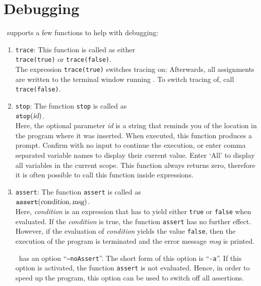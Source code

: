 \section{Debugging}
\setlx\ supports a few functions to help with debugging:
\begin{enumerate}
\item \texttt{trace}:  This function is called as either
      \\[0.2cm]
      \hspace*{1.3cm}
      \texttt{trace(true)} \quad or \quad \texttt{trace(false)}.
      \\[0.2cm]
      The expression \texttt{trace(true)} switches tracing on:  Afterwards, all
      assignments are written to the terminal window running \setlx.  To switch tracing
      of, call \texttt{trace(false)}.
\item \texttt{stop}:  The function \texttt{stop}  is called as
      \\[0.2cm]
      \hspace*{1.3cm}
      $\texttt{stop}(\textsl{id})$.
      \\[0.2cm]
      Here, the optional parameter \textsl{id} is a string that reminds you
      of the location in the program where it was inserted. When executed, this function produces a
      prompt.  Confirm with no input to continue the execution, or enter comma separated variable
      names to display their current value. Enter `All' to display all variables in the current scope.
      This function always returns zero, therefore it is often possible to call this function inside expressions.
\item \texttt{assert}: The function \texttt{assert}  is called as
      \\[0.2cm]
      \hspace*{1.3cm}
      $\texttt{assert}(\textsl{condition}, \textsl{msg})$.
      \\[0.2cm]
      Here, \textsl{condition} is an expression that has to  yield either \texttt{true} or \texttt{false}
      when evaluated. If the \textsl{condition} is true, the function \texttt{assert} has no
      further effect.  However, if the evaluation of \textsl{condition} yields the value
      \texttt{false}, then the execution of the program is terminated and the error message
      \textsl{msg} is printed.

      \setlx\ has an option ``\texttt{--noAssert}''.  The short form of this option is ``\texttt{-a}''.
      If this option is activated, the function \texttt{assert} is not evaluated.  Hence,  in order
      to speed up the program, this option can be used to switch off all assertions.      
\end{enumerate}

